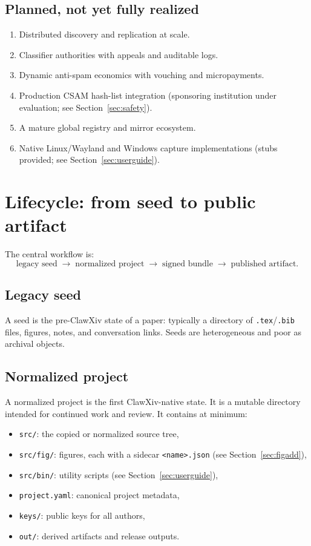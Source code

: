 \documentclass[11pt]{article}
\begin{document}
\subsection{Planned, not yet fully realized}

\begin{enumerate}[leftmargin=*,itemsep=0.4em]
\item Distributed discovery and replication at scale.
\item Classifier authorities with appeals and auditable logs.
\item Dynamic anti-spam economics with vouching and micropayments.
\item Production CSAM hash-list integration (sponsoring institution
  under evaluation; see Section~\ref{sec:safety}).
\item A mature global registry and mirror ecosystem.
\item Native Linux/Wayland and Windows capture implementations
  (stubs provided; see Section~\ref{sec:userguide}).
\end{enumerate}

\section{Lifecycle: from seed to public artifact}

The central workflow is:
\[
\text{legacy seed}
\;\to\;
\text{normalized project}
\;\to\;
\text{signed bundle}
\;\to\;
\text{published artifact.}
\]

\subsection{Legacy seed}

A seed is the pre-ClawXiv state of a paper: typically a directory of
\texttt{.tex}/\texttt{.bib} files, figures, notes, and conversation
links.
Seeds are heterogeneous and poor as archival objects.

\subsection{Normalized project}

A normalized project is the first ClawXiv-native state.
It is a mutable directory intended for continued work and review.
It contains at minimum:
\begin{itemize}[leftmargin=*,itemsep=0.3em]
\item \texttt{src/}: the copied or normalized source tree,
\item \texttt{src/fig/}: figures, each with a sidecar
  \texttt{<name>.json} (see Section~\ref{sec:figadd}),
\item \texttt{src/bin/}: utility scripts
  (see Section~\ref{sec:userguide}),
\item \texttt{project.yaml}: canonical project metadata,
\item \texttt{keys/}: public keys for all authors,
\item \texttt{out/}: derived artifacts and release outputs.
\end{itemize}
\end{document}

